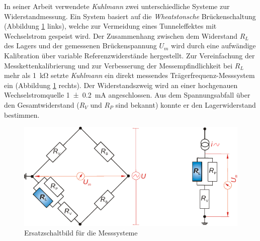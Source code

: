 In seiner Arbeit \cite{kuhlmann_2009} verwendete \textit{Kuhlmann} zwei unterschiedliche Systeme zur Widerstandmessung.
Ein System basiert auf die \textit{Wheatstonsche} Brückenschaltung (Abbildung \ref{fig:ersatzschaltbild_messsysteme_kuhlmann} links), welche zur Vermeidung eines Tunneleffektes mit Wechselstrom gespeist wird.
Der Zusammenhang zwischen dem Widerstand $R_L$ des Lagers und der gemessenen Brückenspannung $U_m$ wird durch eine aufwändige Kalibration über variable Referenzwiderstände hergestellt.
Zur Vereinfachung der Messkettenkalibrierung und zur Verbesserung der Messempfindlichkeit bei $R_L$ mehr als \SI{1}{\kilo\ohm} setzte \textit{Kuhlmann} ein direkt messendes Trägerfrequenz-Messsystem ein (Abbildung \ref{fig:ersatzschaltbild_messsysteme_kuhlmann} rechts).
Der Widerstandszweig wird an einer hochgenauen Wechselstromquelle \SI[separate-uncertainty]{1 +- 0.2}{\milli\ampere} angeschlossen.
Aus dem Spannungsabfall über den Gesamtwiderstand ($R_V$ und $R_P$ sind bekannt) konnte er den Lagerwiderstand bestimmen.
\begin{figure}[htb]
    \centering
    \includegraphics[]{./images/ersatzschaltbild_kuhlmann.pdf}
    \caption{Ersatzschaltbild für die Messsysteme \cite{kuhlmann_2009}}
    \label{fig:ersatzschaltbild_messsysteme_kuhlmann}
\end{figure}
%

